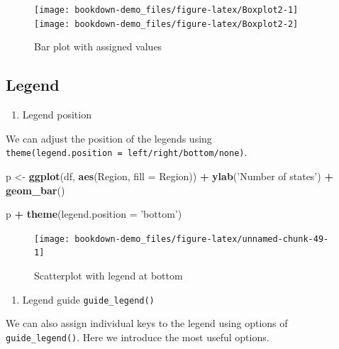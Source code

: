 \documentclass[]{book}
\newenvironment{Shaded}{\begin{snugshade}}{\end{snugshade}}
\newcommand{\KeywordTok}[1]{\textcolor[rgb]{0.13,0.29,0.53}{\textbf{#1}}}
\newcommand{\DataTypeTok}[1]{\textcolor[rgb]{0.13,0.29,0.53}{#1}}
\newcommand{\StringTok}[1]{\textcolor[rgb]{0.31,0.60,0.02}{#1}}
\newcommand{\OperatorTok}[1]{\textcolor[rgb]{0.81,0.36,0.00}{\textbf{#1}}}
\newcommand{\NormalTok}[1]{#1}
\providecommand{\tightlist}{%
  \setlength{\itemsep}{0pt}\setlength{\parskip}{0pt}}
\begin{document}
\begin{figure}
\texttt{[image: bookdown-demo\_files/figure-latex/Boxplot2-1]} \texttt{[image: bookdown-demo\_files/figure-latex/Boxplot2-2]} \caption{Bar plot with assigned values}\label{fig:Boxplot2}
\end{figure}

\subsection{Legend}\label{legend}

\begin{enumerate}
\def\labelenumi{\arabic{enumi}.}
\tightlist
\item
  Legend position
\end{enumerate}

We can adjust the position of the legends using
\texttt{theme(legend.position\ =\ \textquotesingle{}left/right/bottom/none\textquotesingle{})}.

\begin{Shaded}
\begin{Highlighting}[]
\NormalTok{p <-}\StringTok{ }\KeywordTok{ggplot}\NormalTok{(df, }\KeywordTok{aes}\NormalTok{(Region, }\DataTypeTok{fill =}\NormalTok{ Region)) }\OperatorTok{+}
\StringTok{  }\KeywordTok{ylab}\NormalTok{(}\StringTok{'Number of states'}\NormalTok{) }\OperatorTok{+}\StringTok{ }
\StringTok{  }\KeywordTok{geom_bar}\NormalTok{()}

\NormalTok{p }\OperatorTok{+}\StringTok{ }\KeywordTok{theme}\NormalTok{(}\DataTypeTok{legend.position =} \StringTok{'bottom'}\NormalTok{)}
\end{Highlighting}
\end{Shaded}

\begin{figure}

{\centering \texttt{[image: bookdown-demo\_files/figure-latex/unnamed-chunk-49-1]} 

}

\caption{Scatterplot with legend at bottom}\label{fig:unnamed-chunk-49}
\end{figure}

\begin{enumerate}
\def\labelenumi{\arabic{enumi}.}
\setcounter{enumi}{1}
\tightlist
\item
  Legend guide \texttt{guide\_legend()}
\end{enumerate}

We can also assign individual keys to the legend using options of
\texttt{guide\_legend()}. Here we introduce the most useful options.
\end{document}
